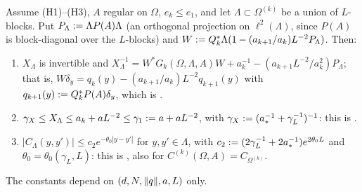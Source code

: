 
\begin{lemma}\label{lem:a06A:blockinv}
Assume (H1)--(H3), $A$ regular on $\Omega$, $e_k\le e_1$, and let $\Lambda\subset\Omega^{(k)}$ be a union of $L$-blocks. Put $P_\Lambda:=\Lambda P(A)\Lambda$ (an orthogonal projection on $\ell^2(\Lambda)$, since $P(A)$ is block-diagonal over the $L$-blocks) and $W:= Q_k^*\Lambda(1-(a_{k+1}/a_k)L^{-2}P_\Lambda)$. Then:
\begin{enumerate}[label=\textup{(\alph*)},nosep,leftmargin=*]
\item $X_\Lambda$ is invertible and $X_\Lambda^{-1}=W^*G_k(\Omega,\Lambda,A)W+a_k^{-1}-(a_{k+1}L^{-2}/a_k^2)P_\Lambda$; that is, $W\delta_y=q_k(y)-(a_{k+1}/a_k)L^{-2}q_{k+1}(y)$ with $q_{k+1}(y):= Q_k^*P(A)\delta_y$, which is \cite[(3.8)]{Ba4}.
\item $\gamma_X\le X_\Lambda\le a_k+aL^{-2}\le\gamma_1:= a+aL^{-2}$, with $\gamma_X:=(a_*^{-1}+\gamma_L^{-1})^{-1}$: this is \cite[(1.15)]{Ba4}.
\item $|C_\Lambda(y,y')|\le c_2e^{-\theta_0|y-y'|}$ for $y,y'\in\Lambda$, with $c_2:=(2\gamma_L^{-1}+2a_*^{-1})e^{2\theta_0L}$ and $\theta_0=\theta_0(\gamma_L,L)$: this is \cite[(1.16)]{Ba4}, also for $C^{(k)}(\Omega,A)=C_{\Omega^{(k)}}$.
\end{enumerate}
The constants depend on $(d,N,\lVert q\rVert,a,L)$ only.
\end{lemma}

